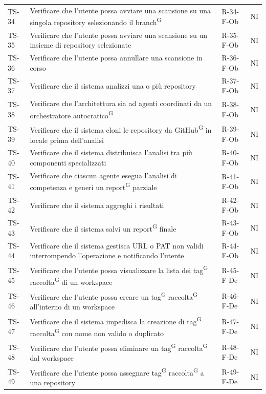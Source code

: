 \documentclass[a4paper, 11pt]{article}
\begin{document}
\begin{longtable}{>{\centering\arraybackslash}m{1.2cm} >{\raggedright\arraybackslash}p{8.2cm} >{\centering\arraybackslash}m{2.5cm} >{\centering\arraybackslash}m{1.2cm}}
TS-34 & Verificare che l'utente possa avviare una scansione su una singola repository selezionando il branch\textsuperscript{G} & R-34-F-Ob & NI \\
TS-35 & Verificare che l'utente possa avviare una scansione su un insieme di repository selezionate & R-35-F-Ob & NI \\
TS-36 & Verificare che l'utente possa annullare una scansione in corso & R-36-F-Ob & NI \\
TS-37 & Verificare che il sistema analizzi una o più repository & R-37-F-Ob & NI \\
TS-38 & Verificare che l'architettura sia ad agenti coordinati da un orchestratore autocratico\textsuperscript{G} & R-38-F-Ob & NI \\
TS-39 & Verificare che il sistema cloni le repository da GitHub\textsuperscript{G} in locale prima dell'analisi & R-39-F-Ob & NI \\
TS-40 & Verificare che il sistema distribuisca l'analisi tra più componenti specializzati & R-40-F-Ob & NI \\
TS-41 & Verificare che ciascun agente esegua l'analisi di competenza e generi un report\textsuperscript{G} parziale & R-41-F-Ob & NI \\
TS-42 & Verificare che il sistema aggreghi i risultati & R-42-F-Ob & NI \\
TS-43 & Verificare che il sistema salvi un report\textsuperscript{G} finale & R-43-F-Ob & NI \\
TS-44 & Verificare che il sistema gestisca URL o PAT non validi interrompendo l'operazione e notificando l'utente & R-44-F-Ob & NI \\
TS-45 & Verificare che l'utente possa visualizzare la lista dei tag\textsuperscript{G} raccolta\textsuperscript{G} di un workspace & R-45-F-De & NI \\
TS-46 & Verificare che l'utente possa creare un tag\textsuperscript{G} raccolta\textsuperscript{G} all'interno di un workspace & R-46-F-De & NI \\
TS-47 & Verificare che il sistema impedisca la creazione di tag\textsuperscript{G} raccolta\textsuperscript{G} con nome non valido o duplicato & R-47-F-De & NI \\
TS-48 & Verificare che l'utente possa eliminare un tag\textsuperscript{G} raccolta\textsuperscript{G} dal workspace & R-48-F-De & NI \\
TS-49 & Verificare che l'utente possa assegnare tag\textsuperscript{G} raccolta\textsuperscript{G} a una repository & R-49-F-De & NI \\

\end{longtable}
\end{document}
